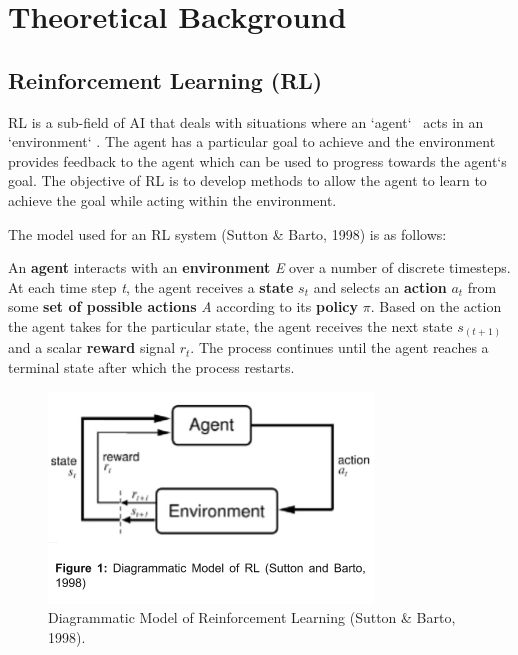 \section{Theoretical Background}

\subsection*{Reinforcement Learning (RL)}
RL is a sub-field of AI that deals with situations where an `agent` \ acts in an `environment` . The agent has a particular goal to achieve and the environment provides feedback to the agent which can be used to progress towards the agent`s goal. The objective of RL is to develop methods to allow the agent to learn to achieve the goal while acting within the environment. 

The model used for an RL system (Sutton \& Barto, 1998) is as follows: 

An \textbf{agent} interacts with an \textbf{environment} \textit{E} over a number of discrete timesteps. At each time step \textit{t}, the agent receives a \textbf{state} $s_{t}$ and selects an \textbf{action} $a_{t}$ from some\textbf{ set of possible actions} \textit{A} according to its \textbf{policy} $\pi$. Based on the action the agent takes for the particular state, the agent receives the next state $s_{(t+1)}$ and a scalar \textbf{reward} signal $r_{t}$. The process continues until the agent reaches a terminal state after which the process restarts. 

 
\begin{figure}[t]
\includegraphics[width=\columnwidth]{fig1.png} 
\caption{Diagrammatic Model of Reinforcement Learning (Sutton \& Barto, 1998).}
\end{figure}	

